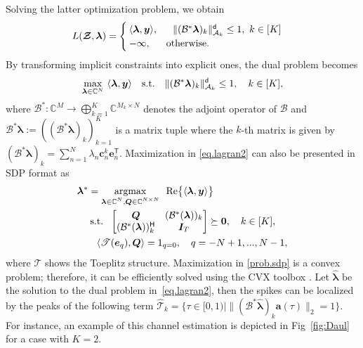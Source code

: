 \documentclass[conference,10pt]{IEEEtran}
\theoremstyle{remark}
\theoremstyle{plain}
\theoremstyle{definition}
\theoremstyle{remark}
\begin{document}
Solving the latter optimization problem, we obtain 
\begin{align}
&L(\bm{\mathcal{Z}},\bm{\lambda})= \begin{cases}
\langle \bm{\lambda},\bm{y}\rangle,&~~ \|(\mathcal{B}^*\bm{\lambda})_k\|_{\mathcal{A}_k}^{\mathsf{d}}\le 1,~ k \in [K] \\
-\infty, &{\rm otherwise.}
\end{cases}	
\end{align}
By transforming implicit constraints into explicit ones, the dual problem becomes
\begin{align}\label{eq.lagran2}
\max_{\bm{\lambda}\in\mathbb{C}^{N}}~\langle \bm{\lambda},\bm{y}\rangle \quad {\rm s.t.}\quad 
\|(\mathcal{B}^*\bm{\lambda})_k\|_{\mathcal{A}_k}^{\mathsf{d}}\le 1,\quad 
k \in [K],
\end{align}
 where $\mathcal{B}^*:\mathbb{C}^{M}\rightarrow \bigoplus_{k=1}^K\mathbb{C}^{M_k\times N}$ denotes the adjoint operator of $\mathcal{B}$ and $\mathcal{B}^*\bm{\lambda}:=((\mathcal{B}^*\bm{\lambda})_k)_{k=1}^K$ is a matrix tuple where the $k$-th matrix is given by $(\mathcal{B}^*\bm{\lambda})_k=\sum\nolimits_{n=1}^{N}\lambda_n\bm{c}^k_n\bm{e}_n^{\mathsf{T}}.$
Maximization in \eqref{eq.lagran2} can also be presented in SDP format as 
\begin{equation}\label{prob.sdp}
    \begin{aligned}
    &\bm{\lambda}^* = \underset{\substack{\bm{\lambda}\in\mathbb{C}^{N}, \bm{Q}\in \mathbb{C}^{N\times N}}}{\rm argmax}~~{\rm Re}\big\{\langle \bm{\lambda}, \bm{y}\rangle\big\}\\
    &~~~~{\rm s.t.}~~
    \begin{bmatrix}
        \bm{Q}&(\mathcal{B}^{*}(\bm{\lambda}))_k\\
        (\mathcal{B}^{*}(\bm{\lambda}))_k^{\mathsf{H}}&\bm{I}_T
    \end{bmatrix}\succeq \bm{0}, \quad k \in [K],\\
    & ~~~~~~\langle \mathscr{T}({\bm{e}_q}), \bm{Q}  \rangle=1_{q=0}, \quad q=-N+1,..., N-1,
    \end{aligned}
\end{equation}	
 where $\mathscr{T}$ shows the Toeplitz structure. 
Maximization in \eqref{prob.sdp} is a convex problem; therefore,  it can be efficiently solved using the CVX toolbox \cite{grant2014cvx}.  Let $\hat{\bm{\lambda}}$ be the solution to the dual problem in~\eqref{eq.lagran2},
then the spikes can be localized by the peaks of the following term $ \hat{\mathcal{T}}_k = \Big\{\tau \in [0,1) | \big\|  (\mathcal{B}^* \hat{\bm{\lambda}})_k \bm{a}(\tau) \big\|_2=1 \Big\}.$ For instance, an example of this channel estimation is depicted in Fig~\ref{fig:Daul} for a case with $K=2$. 
 
\end{document}
